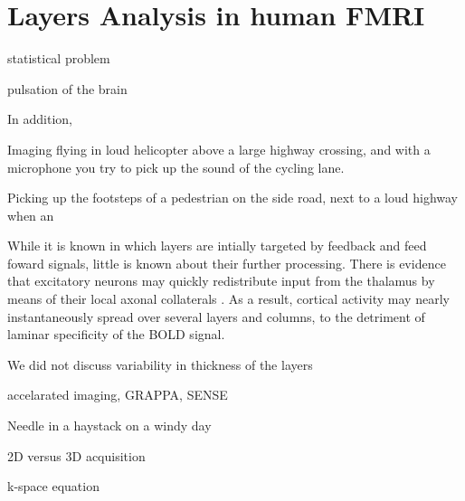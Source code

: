 \section{Layers Analysis in human FMRI}


statistical problem

pulsation of the brain 

In addition, 



Imaging flying in loud helicopter above a large highway crossing, and with a microphone you try to pick up the sound of the cycling lane.

Picking up the footsteps of a pedestrian on the side  road, next to a loud highway when an 



While it is known in which layers are intially targeted by feedback and feed foward signals, little is known about their further processing. There is evidence that excitatory neurons may quickly redistribute input from the thalamus by means of their local axonal collaterals \cite{Guy2017,ReyesPuerta2015}. As a result, cortical activity may nearly instantaneously spread over several layers and columns, to the detriment of laminar specificity of the BOLD signal.

\cite{Maass2014}


We did not discuss variability in thickness of the layers

\cite{Heinzle}

\cite{Renzo}

accelarated imaging, GRAPPA, SENSE


Needle in a haystack on a windy day


2D versus 3D acquisition

k-space equation



